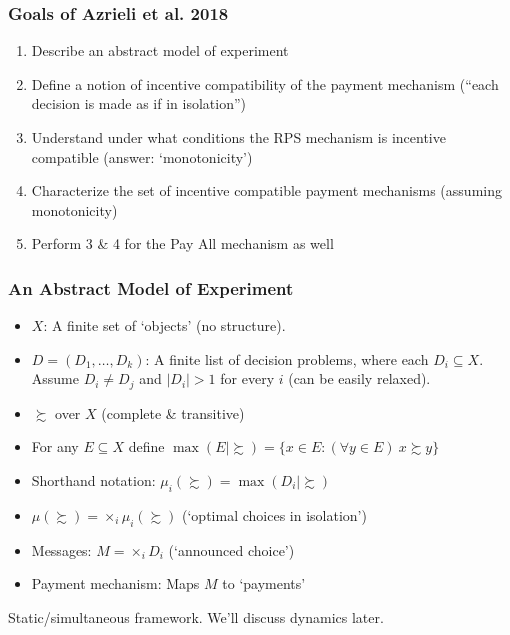 \begin{frame}
  \frametitle{Goals of Azrieli et al. 2018}

  \begin{enumerate}
    \item Describe an abstract model of experiment

    \item Define a notion of incentive compatibility of the payment mechanism (``each decision is made as if in isolation'')

    \item Understand under what conditions the RPS mechanism is incentive compatible (answer: `monotonicity')

    \item Characterize the set of incentive compatible payment mechanisms (assuming monotonicity)

    \item Perform 3 \& 4 for the Pay All mechanism as well

  \end{enumerate}

\end{frame}


\begin{frame}
  \frametitle{An Abstract Model of Experiment}

\begin{itemize}
    \item $X$: A finite set of `objects' (no structure).
    \item $D=(D_1,\ldots,D_k)$: A finite list of decision problems, where each $D_i\subseteq X$. Assume $D_i\neq D_j$ and $|D_i|>1$ for every $i$ (can be easily relaxed).
\end{itemize}

\bigskip

\begin{itemize}
    \item $\succsim$ over $X$ (complete \& transitive)
    \item For any $E\subseteq X$ define $\max(E|\succsim)=\{x\in E:(\forall y\in E)\ x\succsim y\}$
    \item Shorthand notation: $\mu_i(\succsim) = \max(D_i|\succsim)$
    \item $\mu(\succsim) = \times_i \mu_i(\succsim)$ (`optimal choices in isolation')
\end{itemize}

\bigskip

\begin{itemize}
      \item Messages: $M=\times_i D_i$ (`announced choice')
      \item Payment mechanism: Maps $M$ to `payments'
\end{itemize}

\br

Static/simultaneous framework. We'll discuss dynamics later.

\end{frame}

